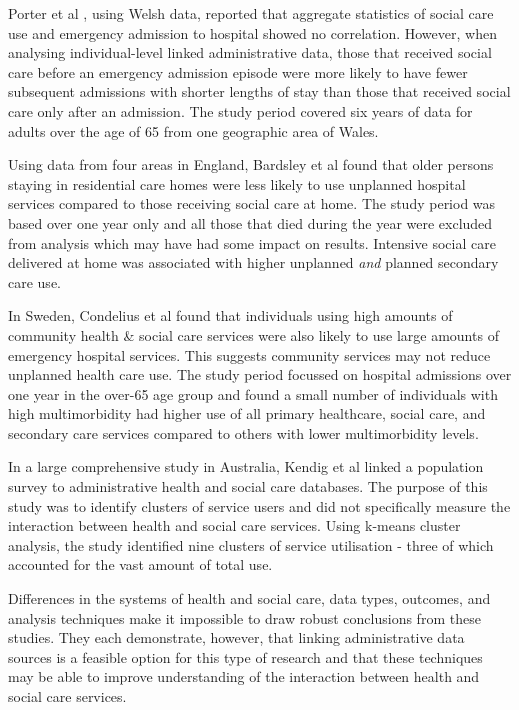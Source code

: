 \documentclass[12pt,]{report}
\begin{document}
Porter et al \citeyearpar{RN462}, using Welsh data, reported that
aggregate statistics of social care use and emergency admission to
hospital showed no correlation. However, when analysing individual-level
linked administrative data, those that received social care before an
emergency admission episode were more likely to have fewer subsequent
admissions with shorter lengths of stay than those that received social
care only after an admission. The study period covered six years of data
for adults over the age of 65 from one geographic area of Wales.

Using data from four areas in England, Bardsley et al
\citeyearpar{RN183} found that older persons staying in residential care
homes were less likely to use unplanned hospital services compared to
those receiving social care at home. The study period was based over one
year only and all those that died during the year were excluded from
analysis which may have had some impact on results. Intensive social
care delivered at home was associated with higher unplanned \textit{and}
planned secondary care use.

In Sweden, Condelius et al \citeyearpar{RN30} found that individuals
using high amounts of community health \& social care services were also
likely to use large amounts of emergency hospital services. This
suggests community services may not reduce unplanned health care use.
The study period focussed on hospital admissions over one year in the
over-65 age group and found a small number of individuals with high
multimorbidity had higher use of all primary healthcare, social care,
and secondary care services compared to others with lower multimorbidity
levels.

In a large comprehensive study in Australia, Kendig et al
\citeyearpar{RN199} linked a population survey to administrative health
and social care databases. The purpose of this study was to identify
clusters of service users and did not specifically measure the
interaction between health and social care services. Using k-means
cluster analysis, the study identified nine clusters of service
utilisation - three of which accounted for the vast amount of total use.

Differences in the systems of health and social care, data types,
outcomes, and analysis techniques make it impossible to draw robust
conclusions from these studies. They each demonstrate, however, that
linking administrative data sources is a feasible option for this type
of research and that these techniques may be able to improve
understanding of the interaction between health and social care
services.
\end{document}
